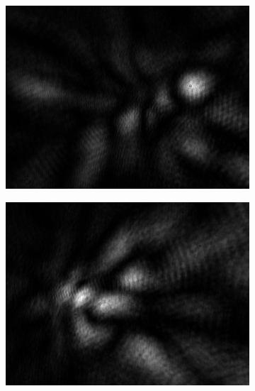 \begin{figure}[!b]
  \begin{subfigure}[b]{0.5\textwidth}
    \includegraphics[width=\textwidth]{PicA1000}
    \caption{}
  \end{subfigure}
  \begin{subfigure}[b]{0.5\textwidth}
    \includegraphics[width=\textwidth]{PicA1001}
    \caption{}
  \end{subfigure}
  \begin{subfigure}[b]{0.5\textwidth}

\end{subfigure}
\end{figure}
